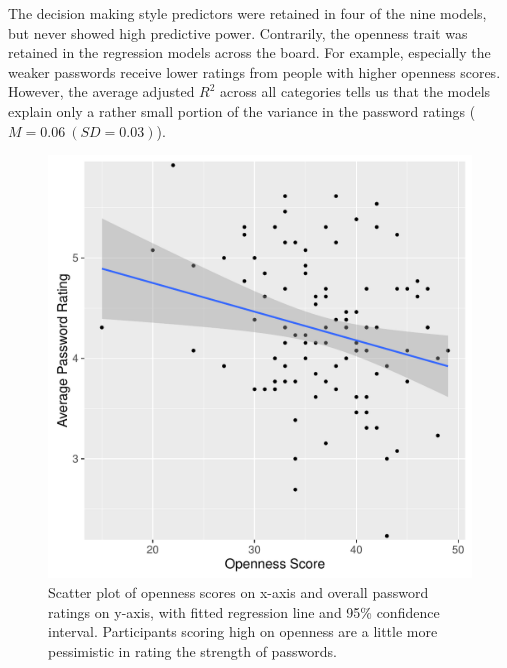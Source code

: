 The decision making style predictors were retained in four of the nine models, but never showed high predictive power. Contrarily, the openness trait was retained in the regression models across the board. For example, especially the weaker passwords receive lower ratings from people with higher openness scores. However, the average adjusted $R^2$ across all categories tells us that the models explain only a rather small portion of the variance in the password ratings ($M=0.06~(SD=0.03)$). 


\begin{figure}
	\centering
	\includegraphics[width=\linewidth]{figures/Openness-ScatterPlot3}
	\caption{\label{fig:openness-scatterplot} Scatter plot of openness scores on x-axis and overall password ratings on y-axis, with fitted regression line and 95\% confidence interval. Participants scoring high on openness are a little more pessimistic in rating the strength of passwords.}
\end{figure}


